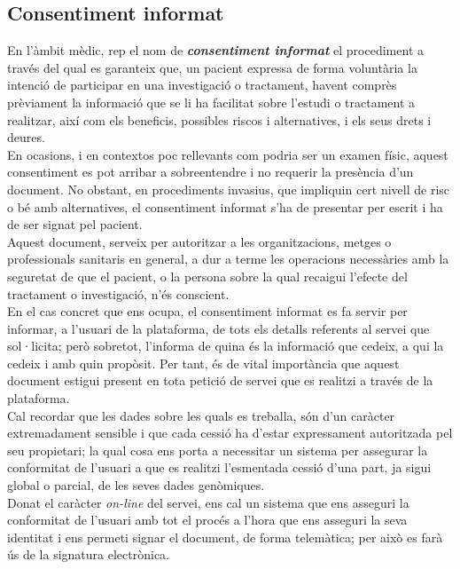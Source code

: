 \subsection{Consentiment informat}
\label{estatArt:consentiment_informat}
En l'àmbit mèdic, rep el nom de \textit{\textbf{consentiment informat}} el procediment a través del qual es garanteix que, un pacient expressa de forma voluntària la intenció de participar en una investigació o tractament, havent comprès prèviament la informació que se li ha facilitat sobre l'estudi o tractament a realitzar, així com els beneficis, possibles riscos i alternatives, i els seus drets i deures.\\
\newline En ocasions, i en contextos poc rellevants com podria ser un examen físic, aquest consentiment es pot arribar a sobreentendre i no requerir la presència d'un document. No obstant, en procediments invasius, que impliquin cert nivell de risc o bé amb alternatives, el consentiment informat s'ha de presentar per escrit i ha de ser signat pel pacient.\\
\newline Aquest document, serveix per autoritzar a les organitzacions, metges o professionals sanitaris en general, a dur a terme les operacions necessàries amb la seguretat de que el pacient, o la persona sobre la qual recaigui l'efecte del tractament o investigació, n'és conscient.\\
\newline En el cas concret que ens ocupa, el consentiment informat es fa servir per informar, a l'usuari de la plataforma, de tots els detalls referents al servei que sol·licita; però sobretot, l'informa de quina és la informació que cedeix, a qui la cedeix i amb quin propòsit. Per tant, és de vital importància que aquest document estigui present en tota petició de servei que es realitzi a través de la plataforma.\\
\newline Cal recordar que les dades sobre les quals es treballa, són d'un caràcter extremadament sensible i que cada cessió ha d'estar expressament autoritzada pel seu propietari; la qual cosa ens porta a necessitar un sistema per assegurar la conformitat de l'usuari a que es realitzi l'esmentada cessió d'una part, ja sigui global o parcial, de les seves dades genòmiques.\\
\newline Donat el caràcter \textit{on-line} del servei, ens cal un sistema que ens asseguri la conformitat de l'usuari amb tot el procés a l'hora que ens asseguri la seva identitat i ens permeti signar el document, de forma telemàtica; per això es farà ús de la signatura electrònica.
